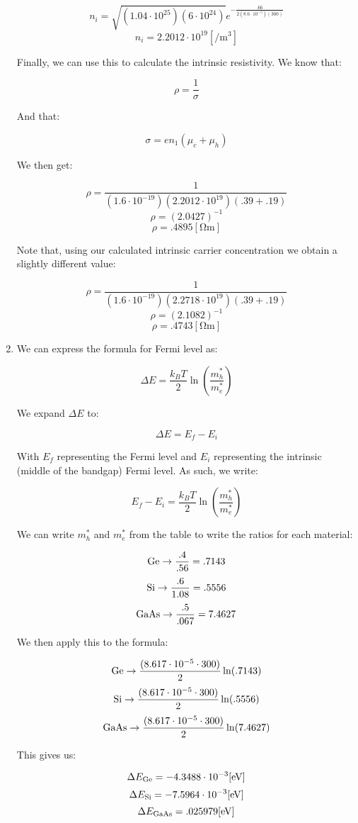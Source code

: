 \begin{enumerate}
    $$n_i=\sqrt{(1.04\cdot10^{25})(6\cdot10^{24})}e^{-\frac{.66}{2(8.6\cdot10^{-5})(300)}}$$
    $$\boxed{n_i=2.2012\cdot10^{19}[\si{\per\meter\cubed}]}$$

    Finally, we can use this to calculate the intrinsic resistivity. We know that:

    $$\rho=\frac{1}{\sigma}$$

    And that:

    $$\sigma=en_1(\mu_c+\mu_h)$$

    We then get:

    $$\rho=\frac{1}{(1.6\cdot10^{-19})(2.2012\cdot10^{19})(.39+.19)}$$
    $$\rho=(2.0427)^{-1}$$
    $$\boxed{\rho=.4895[\si{\ohm\meter}]}$$

    Note that, using our calculated intrinsic carrier concentration we obtain a slightly different value:

    $$\rho=\frac{1}{(1.6\cdot10^{-19})(2.2718\cdot10^{19})(.39+.19)}$$
    $$\rho=(2.1082)^{-1}$$
    $$\boxed{\rho=.4743[\si{\ohm\meter}]}$$

  \item We can express the formula for Fermi level as:

    $$\Delta E=\frac{k_BT}{2}\ln\left( \frac{m_h^*}{m_e^*} \right)$$

    We expand $\Delta E$ to:

    $$\Delta E=E_f-E_i$$

    With $E_f$ representing the Fermi level and $E_i$ representing the intrinsic (middle of the bandgap) Fermi level. As such, we write:

    $$E_f-E_i=\frac{k_BT}{2}\ln\left( \frac{m_h^*}{m_e^*} \right)$$

    We can write $m_h^*$ and $m_e^*$ from the table to write the ratios for each material:

    $$\ce{Ge}\to\frac{.4}{.56}=.7143$$
    $$\ce{Si}\to\frac{.6}{1.08}=.5556$$
    $$\ce{GaAs}\to\frac{.5}{.067}=7.4627$$

    We then apply this to the formula:

    $$\ce{Ge}\to\frac{(8.617\cdot10^{-5}\cdot300)}{2}\ln(.7143)$$
    $$\ce{Si}\to\frac{(8.617\cdot10^{-5}\cdot300)}{2}\ln(.5556)$$
    $$\ce{GaAs}\to\frac{(8.617\cdot10^{-5}\cdot300)}{2}\ln(7.4627)$$

    This gives us:

    $$\Delta E_{\ce{Ge}}=-4.3488\cdot10^{-3}[\si{eV}]$$
    $$\Delta E_{\ce{Si}}=-7.5964\cdot10^{-3}[\si{eV}]$$
    $$\Delta E_{\ce{GaAs}}=.025979[\si{eV}]$$


\end{enumerate}
